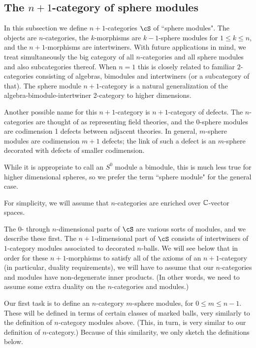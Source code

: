 \subsection{The \texorpdfstring{$n{+}1$}{n+1}-category of sphere modules}
\label{ssec:spherecat}

In this subsection we define $n{+}1$-categories $\cS$ of ``sphere modules".
The objects are $n$-categories, the $k$-morphisms are $k{-}1$-sphere modules for $1\le k \le n$,
and the $n{+}1$-morphisms are intertwiners.
With future applications in mind, we treat simultaneously the big category
of all $n$-categories and all sphere modules and also subcategories thereof.
When $n=1$ this is closely related to familiar $2$-categories consisting of 
algebras, bimodules and intertwiners (or a subcategory of that).
The sphere module $n{+}1$-category is a natural generalization of the 
algebra-bimodule-intertwiner 2-category to higher dimensions.

Another possible name for this $n{+}1$-category is $n{+}1$-category of defects.
The $n$-categories are thought of as representing field theories, and the 
$0$-sphere modules are codimension 1 defects between adjacent theories.
In general, $m$-sphere modules are codimension $m{+}1$ defects;
the link of such a defect is an $m$-sphere decorated with defects of smaller codimension.

\medskip

While it is appropriate to call an $S^0$ module a bimodule,
this is much less true for higher dimensional spheres, 
so we prefer the term ``sphere module" for the general case.

For simplicity, we will assume that $n$-categories are enriched over $\mathbb{C}$-vector spaces.

The $0$- through $n$-dimensional parts of $\cS$ are various sorts of modules, and we describe
these first.
The $n{+}1$-dimensional part of $\cS$ consists of intertwiners
of  $1$-category modules associated to decorated $n$-balls.
We will see below that in order for these $n{+}1$-morphisms to satisfy all of
the axioms of an $n{+}1$-category (in particular, duality requirements), we will have to assume
that our $n$-categories and modules have non-degenerate inner products.
(In other words, we need to assume some extra duality on the $n$-categories and modules.)

\medskip

Our first task is to define an $n$-category $m$-sphere modules, for $0\le m \le n-1$.
These will be defined in terms of certain classes of marked balls, very similarly
to the definition of $n$-category modules above.
(This, in turn, is very similar to our definition of $n$-category.)
Because of this similarity, we only sketch the definitions below.

